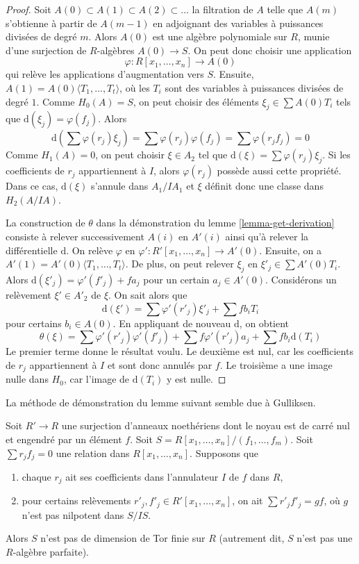 \begin{proof}
Soit $A(0) \subset A(1) \subset A(2) \subset\ldots$ la filtration
de $A$ telle que $A(m)$ s'obtienne à partir de $A(m - 1)$ en adjoignant des
variables à puissances divisées de degré $m$. Alors $A(0)$ est une algèbre
polynomiale sur $R$, munie d'une surjection de $R$-algèbres $A(0) \to S$.
On peut donc choisir une application
$$
\varphi : R[x_1, \ldots, x_n] \to A(0)
$$
qui relève les applications d'augmentation vers $S$.
Ensuite, $A(1) = A(0)\langle T_1, \ldots, T_t \rangle$, où
les $T_i$ sont des variables à puissances divisées de degré $1$. Comme $H_0(A) = S$, on
peut choisir des éléments $\xi_j \in\sum A(0)T_i$ tels que $\text{d}(\xi_j) = \varphi(f_j)$.
Alors
$$
\text{d}\left(\sum\varphi(r_j) \xi_j\right) =
\sum\varphi(r_j) \varphi(f_j) = \sum\varphi(r_jf_j) = 0
$$
Comme $H_1(A) = 0$, on peut choisir $\xi\in A_2$ tel que
$\text{d}(\xi) = \sum\varphi(r_j) \xi_j$.
Si les coefficients de $r_j$ appartiennent à $I$,
alors $\varphi(r_j)$ possède aussi cette propriété. Dans ce cas,
$\text{d}(\xi)$ s'annule dans $A_1/IA_1$ et
$\xi$ définit donc une classe dans $H_2(A/IA)$.

\medskip\noindent
La construction de $\theta$ dans la démonstration du lemme \ref{lemma-get-derivation}
consiste à relever successivement $A(i)$ en $A'(i)$ ainsi qu'à relever
la différentielle $\text{d}$. On relève $\varphi$
en $\varphi' : R'[x_1, \ldots, x_n] \to A'(0)$.
Ensuite, on a $A'(1) = A'(0)\langle T_1, \ldots, T_t\rangle$.
De plus, on peut relever $\xi_j$ en $\xi'_j \in\sum A'(0)T_i$.
Alors $\text{d}(\xi'_j) = \varphi'(f'_j) + f a_j$ pour un certain
$a_j \in A'(0)$.
Considérons un relèvement $\xi' \in A'_2$ de $\xi$.
On sait alors que
$$
\text{d}(\xi') = \sum\varphi'(r'_j)\xi'_j + \sum fb_iT_i
$$
pour certains $b_i \in A(0)$. En appliquant de nouveau $\text{d}$, on obtient
$$
\theta(\xi) = \sum\varphi'(r'_j)\varphi'(f'_j) +
\sum f \varphi'(r'_j) a_j + \sum fb_i \text{d}(T_i)
$$
Le premier terme donne le résultat voulu. Le deuxième est
nul, car les coefficients de $r_j$ appartiennent à $I$ et sont
donc annulés par $f$. Le troisième a une image nulle dans $H_0$,
car l'image de $\text{d}(T_i)$ y est nulle.
\end{proof}

\noindent
La méthode de démonstration du lemme suivant semble due à Gulliksen.

\begin{lemma}
\label{lemma-not-finite-pd}
Soit $R' \to R$ une surjection d'anneaux noethériens dont le noyau est de
carré nul et engendré par un élément $f$. Soit
$S = R[x_1, \ldots, x_n]/(f_1, \ldots, f_m)$.
Soit $\sum r_j f_j = 0$ une relation dans $R[x_1, \ldots, x_n]$.
Supposons que
\begin{enumerate}
\item chaque $r_j$ ait ses coefficients dans l'annulateur $I$ de $f$ dans $R$,
\item pour certains relèvements $r'_j, f'_j \in R'[x_1, \ldots, x_n]$, on ait
$\sum r'_j f'_j = gf$, où $g$ n'est pas nilpotent dans $S/IS$.
\end{enumerate}
Alors $S$ n'est pas de dimension de Tor finie sur $R$ (autrement dit, $S$ n'est
pas une $R$-algèbre parfaite).
\end{lemma}


